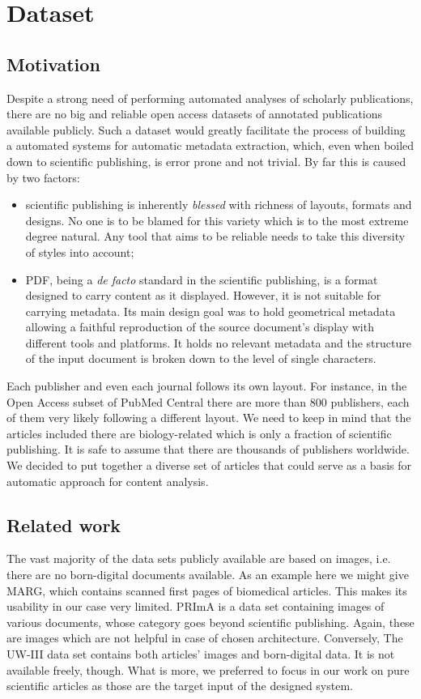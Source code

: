 \chapter{Dataset}
\section{Motivation}
Despite a strong need of performing automated analyses of scholarly publications, there are no big and reliable open access datasets of annotated publications available publicly. Such a dataset would greatly facilitate the process of building a automated systems for automatic metadata extraction, which, even when boiled down to scientific publishing, is error prone and not trivial. By far this is caused by two factors:
\begin{itemize}
\item scientific publishing is inherently \textit{blessed} with richness of layouts, formats and designs. No one is to be blamed for this variety which is to the most extreme degree natural. Any tool that aims to be reliable needs to take this diversity of styles into account;
\item PDF, being a \textit{de facto} standard in the scientific publishing, is a format designed to carry content as it displayed. However, it is not suitable for carrying metadata. Its main design goal was to hold geometrical metadata allowing a faithful reproduction of the source document's display with different tools and platforms. It holds no relevant metadata and the structure of the input document is broken down to the level of single characters.
\end{itemize}
Each publisher and even each journal follows its own layout. For instance, in the Open Access subset of PubMed Central there are more than 800 publishers, each of them very likely following a different layout. We need to keep in mind that the articles included there are biology-related which is only a fraction of scientific publishing. It is safe to assume that there are thousands of publishers worldwide. We decided to put together a diverse set of articles that could serve as a basis for automatic approach for content analysis. 

\section{Related work}
The vast majority of the data sets publicly available are based on images, i.e. there are no born-digital documents available. As an example here we might give MARG, which contains scanned first pages of biomedical articles. This makes its usability in our case very limited. PRImA is a data set containing images of various documents, whose category goes beyond scientific publishing. Again, these are images which are not helpful in case of chosen architecture. Conversely, The UW-III data set contains both articles' images and born-digital data. It is not available freely, though. What is more, we preferred to focus in our work on pure scientific articles as those are the target input of the designed system.
